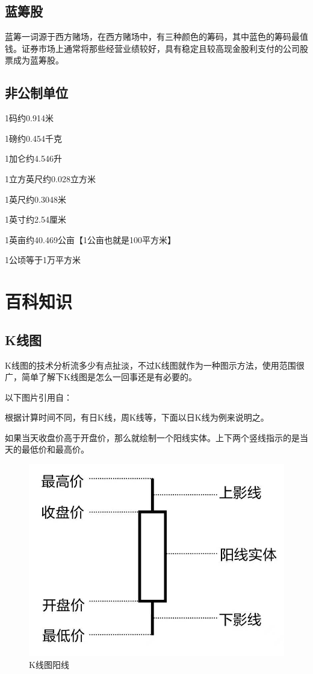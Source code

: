 \documentclass[12pt,oneside]{book}
\begin{document}
\section{蓝筹股}
蓝筹一词源于西方赌场，在西方赌场中，有三种颜色的筹码，其中蓝色的筹码最值钱。证券市场上通常将那些经营业绩较好，具有稳定且较高现金股利支付的公司股票成为蓝筹股。


\section{非公制单位}
1码约0.914米

1磅约0.454千克

1加仑约4.546升

1立方英尺约0.028立方米

1英尺约0.3048米

1英寸约2.54厘米

1英亩约40.469公亩【1公亩也就是100平方米】

1公顷等于1万平方米

\chapter{百科知识}
\section{K线图}
K线图的技术分析流多少有点扯淡，不过K线图就作为一种图示方法，使用范围很广，简单了解下K线图是怎么一回事还是有必要的。

以下图片引用自\cite{从零开始学K线}：

根据计算时间不同，有日K线，周K线等，下面以日K线为例来说明之。

如果当天收盘价高于开盘价，那么就绘制一个阳线实体。上下两个竖线指示的是当天的最低价和最高价。

\begin{figure}[H]
\centering
\includegraphics[width=\linewidth ,totalheight=0.95\textheight , keepaspectratio]{K线图阳线.jpg}
\caption{K线图阳线}
\end{figure}
\end{document}
